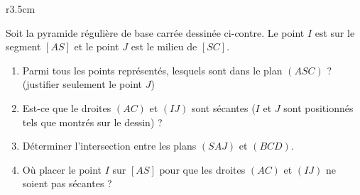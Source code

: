 
\begin{exercice}[\ldots/4]\label{exosmath-0700}

\begin{wrapfigure}{r}{3.5cm}
   \vspace{-0.5cm}        %
   \centering
   
\end{wrapfigure}

Soit la pyramide régulière de base carrée dessinée ci-contre. Le point \( I\) est sur le segment \( [AS]\) et le point \( J\) est le milieu de \( [SC]\).
        \begin{enumerate}
            \item
                Parmi tous les points représentés, lesquels sont dans le plan \( (ASC)\) ? (justifier seulement le point \( J\))
            \item
                Est-ce que le droites \( (AC)\) et \( (IJ)\) sont sécantes (\( I\) et \( J\) sont positionnés tels que montrés sur le dessin) ?
            \item
                Déterminer l'intersection entre les plans \( (SAJ)\) et \( (BCD)\).
            \item
                Où placer le point \( I\) sur \( [AS]\) pour que les droites \( (AC)\) et \( (IJ)\) ne soient pas sécantes ?
        \end{enumerate}


\end{exercice}
